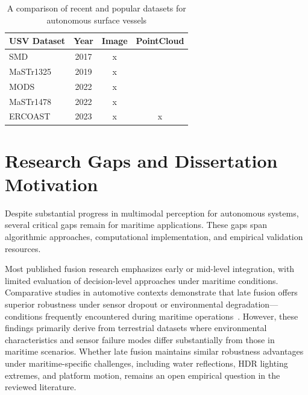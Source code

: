 \documentclass{erauthesis}
\begin{document}
\begin{table}[!t]
\centering
\begin{tabular}{lccc}
\hline
USV Dataset                          & Year & Image & PointCloud \\
\hline
\hline

SMD \cite{prasad2017}               & 2017 & x     &            \\
MaSTr1325 \cite{bovcon2019}         & 2019 & x     &            \\
MODS \cite{bovcon2022}              & 2022 & x     &            \\
MaSTr1478 \cite{zust2022}           & 2022 & x     &            \\
ERCOAST \cite{thompson2023}         & 2023 & x     & x          \\
\hline
\end{tabular}
\caption{A comparison of recent and popular datasets for autonomous surface vessels}
\label{tbl:usv_datasets}
\end{table}



\section{Research Gaps and Dissertation Motivation}

Despite substantial progress in multimodal perception for autonomous systems, several critical gaps remain for maritime applications.
These gaps span algorithmic approaches, computational implementation, and empirical validation resources.

Most published fusion research emphasizes early or mid-level integration, with limited evaluation of decision-level approaches under maritime conditions.
Comparative studies in automotive contexts demonstrate that late fusion offers superior robustness under sensor dropout or environmental degradation—conditions frequently encountered during maritime operations~\cite{huang2024, wang2020a}.
However, these findings primarily derive from terrestrial datasets where environmental characteristics and sensor failure modes differ substantially from those in maritime scenarios.
Whether late fusion maintains similar robustness advantages under maritime-specific challenges, including water reflections, HDR lighting extremes, and platform motion, remains an open empirical question in the reviewed literature.
\end{document}
